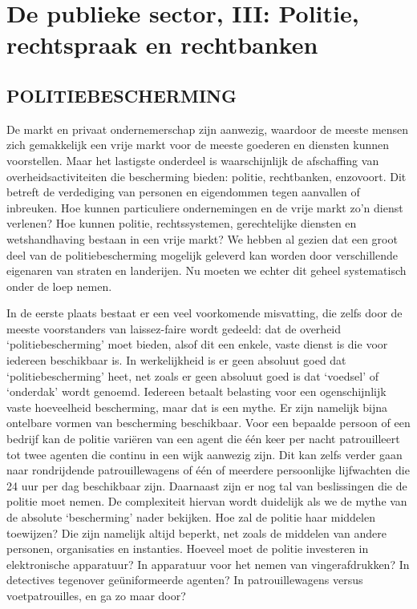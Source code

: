 \documentclass[
  a5paper,
  smalldemyvopaper,10pt,twoside,onecolumn,openright,extrafontsizes,hidelinks]{memoir}
\begin{document}
\chapter{De publieke sector, III: Politie, rechtspraak en
rechtbanken}\label{de-publieke-sector-iii-politie-rechtspraak-en-rechtbanken}

\section{\texorpdfstring{\textbf{POLITIEBESCHERMING}}{POLITIEBESCHERMING}}\label{politiebescherming}

De markt en privaat ondernemerschap zijn aanwezig, waardoor de meeste
mensen zich gemakkelijk een vrije markt voor de meeste goederen en
diensten kunnen voorstellen. Maar het lastigste onderdeel is
waarschijnlijk de afschaffing van overheidsactiviteiten die bescherming
bieden: politie, rechtbanken, enzovoort. Dit betreft de verdediging van
personen en eigendommen tegen aanvallen of inbreuken. Hoe kunnen
particuliere ondernemingen en de vrije markt zo'n dienst verlenen? Hoe
kunnen politie, rechtssystemen, gerechtelijke diensten en wetshandhaving
bestaan in een vrije markt? We hebben al gezien dat een groot deel van
de politiebescherming mogelijk geleverd kan worden door verschillende
eigenaren van straten en landerijen. Nu moeten we echter dit geheel
systematisch onder de loep nemen.

In de eerste plaats bestaat er een veel voorkomende misvatting, die
zelfs door de meeste voorstanders van laissez-faire wordt gedeeld: dat
de overheid `politiebescherming' moet bieden, alsof dit een enkele,
vaste dienst is die voor iedereen beschikbaar is. In werkelijkheid is er
geen absoluut goed dat `politiebescherming' heet, net zoals er geen
absoluut goed is dat `voedsel' of `onderdak' wordt genoemd. Iedereen
betaalt belasting voor een ogenschijnlijk vaste hoeveelheid bescherming,
maar dat is een mythe. Er zijn namelijk bijna ontelbare vormen van
bescherming beschikbaar. Voor een bepaalde persoon of een bedrijf kan de
politie variëren van een agent die één keer per nacht patrouilleert tot
twee agenten die continu in een wijk aanwezig zijn. Dit kan zelfs verder
gaan naar rondrijdende patrouillewagens of één of meerdere persoonlijke
lijfwachten die 24 uur per dag beschikbaar zijn. Daarnaast zijn er nog
tal van beslissingen die de politie moet nemen. De complexiteit hiervan
wordt duidelijk als we de mythe van de absolute `bescherming' nader
bekijken. Hoe zal de politie haar middelen toewijzen? Die zijn namelijk
altijd beperkt, net zoals de middelen van andere personen, organisaties
en instanties. Hoeveel moet de politie investeren in elektronische
apparatuur? In apparatuur voor het nemen van vingerafdrukken? In
detectives tegenover geüniformeerde agenten? In patrouillewagens versus
voetpatrouilles, en ga zo maar door?
\end{document}
